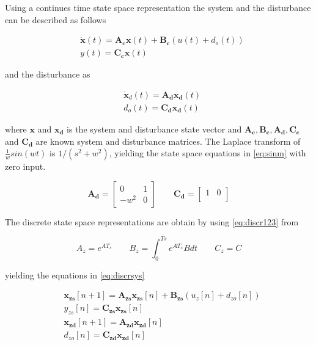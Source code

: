 Using a continues time state space representation the system and the disturbance can be described as follows

\begin{subequations}
  \label{eq:sys12}
  \begin{alignat}{2}
    \label{eq:sys1}
    & \mathbf{\dot{x}}(t) = \mathbf{A_cx}(t) + \mathbf{B_c}(u(t) + d_o(t)) \\
    \label{eq:sys2}
    & y(t) = \mathbf{C_cx}(t)
  \end{alignat}
\end{subequations}

and the disturbance as

\begin{subequations}
  \label{eq:dist12}
  \begin{alignat}{2}
    \label{eq:dist1}
    & \mathbf{\dot{x}}_d(t) = \mathbf{A_dx_d}(t) \\
    \label{eq:dist2}
    & d_o(t) = \mathbf{C_dx_d}(t)
  \end{alignat}
\end{subequations}

where $\mathbf{x}$ and $\mathbf{x_d}$ is the system and disturbance state vector and $\mathbf{A_c, B_c, A_d, C_c}$ and $\mathbf{C_d}$ are known system and disturbance matrices. The Laplace transform of $\frac{1}{w}sin(wt)$ is $1/(s^2 + w^2)$, yielding the state space equations in \eqref{eq:sinm} with zero input.

\begin{equation}
  \label{eq:sinm}
  \mathbf{A_d} =
    \begin{bmatrix}
       0 & 1\\[0.3em]
       -w^2 & 0
     \end{bmatrix}
     \qquad
  \mathbf{C_d} =
    \begin{bmatrix}
        1 & 0\\
    \end{bmatrix}
\end{equation}

The discrete state space representations are obtain by using \eqref{eq:discr123} from \citep{industrial}

\begin{equation}
  \label{eq:discr123}
  A_z = e^{AT_s}  \qquad B_z = \int_{0}^{Ts} e^{AT_s}B dt \qquad C_z = C
\end{equation}

yielding the equations in \eqref{eq:discrsys}

\begin{subequations}
  \label{eq:discrsys}
  \begin{alignat}{2}
    & \mathbf{x_{zs}}[n + 1] = \mathbf{A_{zs}x_{zs}}[n] + \mathbf{B_{zs}}(u_z[n] + d_{zo}[n]) \\
    & y_{zs}[n] = \mathbf{C_{zs}x_{zs}}[n] \\
    & \mathbf{x_{zd}}[n + 1] = \mathbf{A_{zd}x_{zd}}[n]\\
    & d_{zo}[n] = \mathbf{C_{zd}x_{zd}}[n]
  \end{alignat}
\end{subequations}

